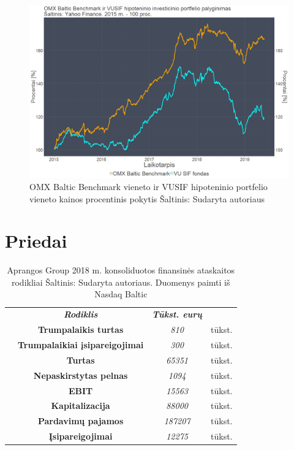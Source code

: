 \documentclass[12pt]{article}
\begin{document}
\begin{figure}[H]
\captionsetup{justification=centering}
\center
\includegraphics[scale=0.4]{PORTFELIS.png}
\caption{OMX Baltic Benchmark vieneto ir VUSIF hipoteninio portfelio vieneto kainos procentinis pokytis \newline
Šaltinis: Sudaryta autoriaus}
\end{figure}
\section{Priedai}
\begin{table}[H]
\captionsetup{justification=centering}
\centering
\begin{tabular}{l|c|c|l|}
\cline{2-4}
 & \textit{\textbf{Rodiklis}}             & \textit{\textbf{Tūkst. eurų}} & \textbf{} \\ \cline{2-4} 
 & \textbf{Trumpalaikis turtas}           & \textit{810}                  & tūkst.    \\ \cline{2-4} 
 & \textbf{Trumpalaikiai įsipareigojimai} & \textit{300}                  & tūkst.    \\ \cline{2-4} 
 & \textbf{Turtas}                        & \textit{65351}                & tūkst.    \\ \cline{2-4} 
 & \textbf{Nepaskirstytas pelnas}          & \textit{1094}                 & tūkst.    \\ \cline{2-4} 
 & \textbf{EBIT}                          & \textit{15563}                & tūkst.    \\ \cline{2-4} 
 & \textbf{Kapitalizacija}                & \textit{88000}                & tūkst.    \\ \cline{2-4} 
 & \textbf{Pardavimų pajamos}             & \textit{187207}               & tūkst.    \\ \cline{2-4} 
 & \textbf{Įsipareigojimai}               & \textit{12275}                & tūkst.    \\ \cline{2-4} 
\end{tabular}
\caption{Aprangos Group 2018 m. konsoliduotos finansinės ataskaitos rodikliai \newline
Šaltinis: Sudaryta autoriaus. Duomenys paimti iš Nasdaq Baltic}
\end{table}
\end{document}
